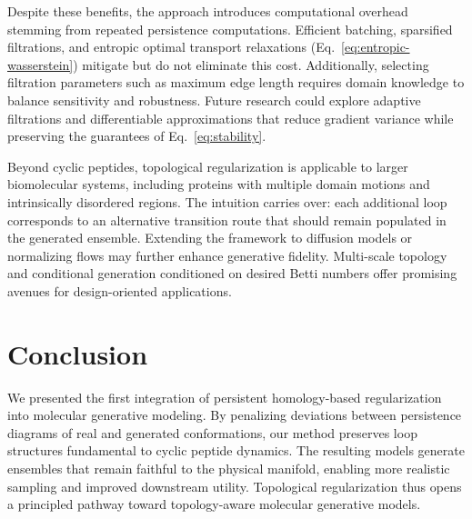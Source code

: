 \documentclass[11pt]{article}
\begin{document}
Despite these benefits, the approach introduces computational overhead stemming from repeated persistence computations. Efficient batching, sparsified filtrations, and entropic optimal transport relaxations (Eq.~\eqref{eq:entropic-wasserstein}) mitigate but do not eliminate this cost. Additionally, selecting filtration parameters such as maximum edge length requires domain knowledge to balance sensitivity and robustness. Future research could explore adaptive filtrations and differentiable approximations that reduce gradient variance while preserving the guarantees of Eq.~\eqref{eq:stability}.

Beyond cyclic peptides, topological regularization is applicable to larger biomolecular systems, including proteins with multiple domain motions and intrinsically disordered regions. The intuition carries over: each additional loop corresponds to an alternative transition route that should remain populated in the generated ensemble. Extending the framework to diffusion models or normalizing flows may further enhance generative fidelity. Multi-scale topology and conditional generation conditioned on desired Betti numbers offer promising avenues for design-oriented applications.

\section{Conclusion}
We presented the first integration of persistent homology-based regularization into molecular generative modeling. By penalizing deviations between persistence diagrams of real and generated conformations, our method preserves loop structures fundamental to cyclic peptide dynamics. The resulting models generate ensembles that remain faithful to the physical manifold, enabling more realistic sampling and improved downstream utility. Topological regularization thus opens a principled pathway toward topology-aware molecular generative models.
\end{document}
